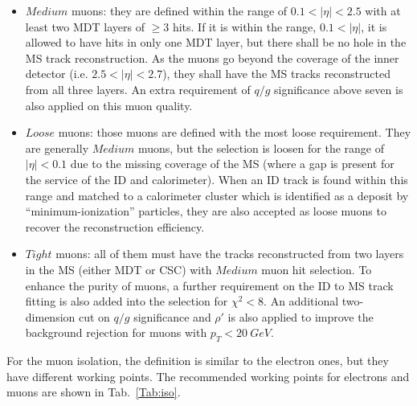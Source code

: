 \begin{itemize}
	\item $Medium$ muons: they are defined within the range of $0.1<|\eta|<2.5$ with at least two MDT layers of $\geq 3$ hits. If it is within the range, $0.1<|\eta|$, it is allowed to have hits in only one MDT layer, but there shall be no hole in the MS track reconstruction. As the muons go beyond the coverage of the inner detector (i.e. $2.5<|\eta|<2.7$), they shall have the MS tracks reconstructed from all three layers. An extra requirement of $q/g$ significance above seven is also applied on this muon quality. 
	\item $Loose$ muons: those muons are defined with the most loose requirement. They are generally $Medium$ muons, but the selection is loosen for the range of $|\eta|<0.1$ due to the missing coverage of the MS (where a gap is present for the service of the ID and calorimeter). When an ID track is found within this range and matched to a calorimeter cluster which is identified as a deposit by ``minimum-ionization'' particles, they are also accepted as loose muons to recover the reconstruction efficiency. 
	\item $Tight$ muons: all of them must have the tracks reconstructed from two layers in the MS (either MDT or CSC) with $Medium$ muon hit selection. To enhance the purity of muons, a further requirement on the ID to MS track fitting is also added into the selection for $\chi^2<8$. An additional two-dimension cut on $q/g$ significance and $\rho'$ is also applied to improve the background rejection for muons with $p_{T}<20~GeV$.
\end{itemize}
For the muon isolation, the definition is similar to the electron ones, but they have different working points. The recommended working points for electrons and muons are shown in Tab.~\ref{Tab:iso}.

